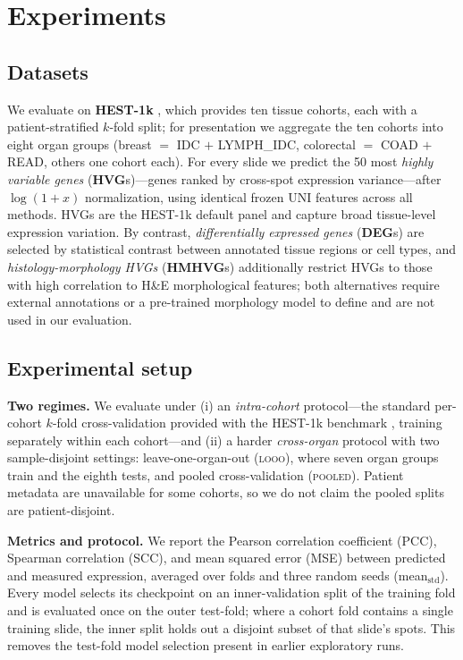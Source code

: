 \documentclass[10pt,twocolumn,letterpaper]{article}
\begin{document}
\section{Experiments}

\subsection{Datasets}
\label{sec:datasets}
We evaluate on \textbf{HEST-1k} \cite{jaume2024hest}, which provides ten tissue
cohorts, each with a patient-stratified $k$-fold split; for presentation we aggregate the ten cohorts
into eight organ groups (breast $=$ IDC $+$ LYMPH\_IDC, colorectal $=$ COAD $+$ READ, others one
cohort each). For every slide we predict the 50 most \emph{highly variable genes}
(\textbf{HVG}s)---genes ranked by cross-spot expression variance---after $\log(1+x)$
normalization, using identical frozen UNI \cite{chen2024uni} features across all methods.
HVGs are the HEST-1k default panel and capture broad tissue-level expression variation.
By contrast, \emph{differentially expressed genes} (\textbf{DEG}s) are selected by
statistical contrast between annotated tissue regions or cell types, and
\emph{histology-morphology HVGs} (\textbf{HMHVG}s) additionally restrict HVGs to those
with high correlation to H\&E morphological features; both alternatives require external
annotations or a pre-trained morphology model to define and are not used in our evaluation.

\subsection{Experimental setup}
\label{sec:setup}
\textbf{Two regimes.} We evaluate under (i) an \emph{intra-cohort} protocol---the standard per-cohort
$k$-fold cross-validation provided with the HEST-1k benchmark \cite{jaume2024hest}, training
separately within each cohort---and (ii) a harder \emph{cross-organ} protocol with two
sample-disjoint settings:
leave-one-organ-out (\textsc{looo}), where seven organ groups train and the eighth tests, and pooled
cross-validation (\textsc{pooled}). Patient metadata are unavailable for some cohorts, so we do not
claim the pooled splits are patient-disjoint.

\textbf{Metrics and protocol.} We report the Pearson correlation coefficient (PCC), Spearman
correlation (SCC), and mean squared error (MSE) between predicted and measured expression, averaged
over folds and three random seeds (mean$_{\mathrm{std}}$). Every model selects its checkpoint on an
inner-validation split of the training fold and is evaluated once on the outer test-fold; where a
cohort fold contains a single training slide, the inner split holds out a disjoint subset of that
slide's spots. This removes the test-fold model selection present in earlier exploratory runs.
\end{document}
